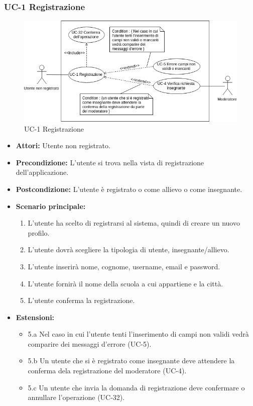 \subsubsection{UC-1 Registrazione}
\begin{figure}[h]
	\centering
	\includegraphics[scale=0.7]{images/UC-1.png}
	\caption{UC-1 Registrazione}
\end{figure}	

\begin{itemize}
		\item \textbf{Attori: }Utente non registrato.
		\item \textbf{Precondizione: }L'utente si trova nella vista di registrazione dell'applicazione.
		\item \textbf{Postcondizione: }L'utente è registrato o come allievo o come insegnante.
		\item \textbf{Scenario principale: }
		\begin{enumerate}
		\item L'utente ha scelto di registrarsi al sistema, quindi di creare un nuovo profilo. 
		\item L'utente dovrà scegliere la tipologia di utente, insegnante/allievo. 
		\item L'utente inserirà nome, cognome, username, email e password.
		\item L'utente fornirà il nome della scuola a cui appartiene e la città.
		\item L'utente conferma la registrazione.
		\end{enumerate}
		\item \textbf{Estensioni: }
		\begin{itemize}
			\item 5.a Nel caso in cui l'utente tenti l'inserimento di campi non validi vedrà comparire dei messaggi d'errore (UC-5).
			\item 5.b Un utente che si è registrato come insegnante deve attendere la conferma dela registrazione del moderatore (UC-4).
			\item 5.c Un utente che invia la domanda di registrazione deve confermare o annullare l'operazione (UC-32).
		\end{itemize}
	\end{itemize}
